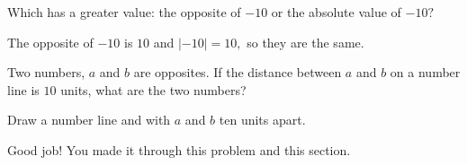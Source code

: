 \documentclass{ximera}[font=12pt]
\begin{document}
\begin{problem}
Which has a greater value: the opposite of $-10$ or the absolute value of $-10?$  

\begin{multipleChoice}
\end{multipleChoice}

\begin{feedback}
The opposite of $-10$ is $10$ and $|-10| = 10,$ so they are the same.
\end{feedback}

\end{problem}


\begin{problem}
Two numbers, $a$ and $b$ are opposites. If the distance between
$a$ and $b$ on a number line is $10$ units, what are the two numbers?

\begin{multipleChoice}
\end{multipleChoice}

\begin{hint}
Draw a number line and with $a$ and $b$ ten units apart.
\end{hint}

\begin{feedback}[correct]
Good job!  You made it through this problem and this section.
\end{feedback}

\end{problem}
\end{document}
